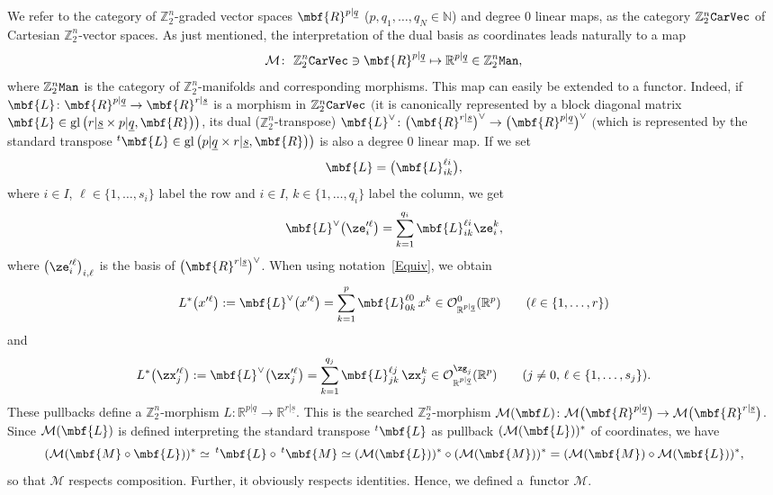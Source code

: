 \documentclass[pdftex]{sigma}%
\newcommand{\op}[1]{\operatorname{#1}}
\newcommand{\R}{{\mathbb R}}
\newcommand{\Z}{{\mathbb Z}}
\def\ul{\underline}
\def\cM{\cal M}
\def\cO{\mathcal{O}}
\def\cM{\mathcal{M}}
\def\ul{\underline}
\newcommand{\0}{\otimes}
\numberwithin{equation}{section}
\begin{document}
We refer to the category of $\Z_2^n$-graded vector spaces $\mbf{R}^{p|\ul q}$ ($p, q_1,\dots,q_N\in\mathbb N$) and degree 0 linear maps, as the category $\Z_2^n\tt CarVec$ of Cartesian $\Z_2^n$-vector spaces. As just mentioned, the interpretation of the dual basis as coordinates leads naturally to a map
\[
\mathcal{M}\colon\ \Z_2^n{\tt CarVec}\ni\mbf{R}^{p|\ul q}\mapsto \R^{p|\ul q}\in\Z_2^n\tt Man,
\]
where $\Z_2^n\tt Man$ is the category of $\Z_2^n$-manifolds and corresponding morphisms. This map can easily be extended to a functor. Indeed, if $\mbf{L}\colon \mbf{R}^{p|\ul q}\to \mbf{R}^{r|\ul s}$ is a morphism in $\Z_2^n\tt CarVec$ $\big($it is canonically represented by a block diagonal matrix $\mbf{L}\in\op{gl}\big(r|\ul{s}\times p|\ul{q},\mbf{R}\big)\big)$, its dual ($\Z_2^n$-transpose) $\mbf{L}^\vee\colon \big(\mbf{R}^{r|\ul s}\big)^\vee\to \big(\mbf{R}^{p|\ul q}\big)^\vee$ $\big($which is represented by the standard transpose $^t\mbf{L}\in\op{gl}\big(p|\ul{q}\times r|\ul{s},\mbf{R}\big)\big)$ is also a degree 0 linear map. If we set
\[
\mbf{L}=\big(\mbf{L}^{\ell i}_{i k}\big),
\]
where $i\in I$, $\ell\in\{1,\dots, s_i\}$ label the row and $i\in I$, $k\in\{1,\dots,q_i\}$ label the column, we get
\[
\mbf{L}^\vee\big(\ze'^\ell_i\big)=\sum_{k=1}^{q_i} \mbf{L}^{\ell i}_{i k}\ze^k_i,
\]
where $\big(\ze'^\ell_i\big)_{i,\ell}$ is the basis of $\big(\mbf{R}^{r|\ul s}\big)^\vee$. When using notation~\eqref{Equiv}, we obtain
\begin{gather}\label{Pull1}
L^*\big(x'^\ell\big):=\mbf{L}^\vee\big(x'^\ell\big)=\sum_{k=1}^{p} \mbf{L}^{\ell 0}_{0 k}\,x^k\in \cO_{\R^{p|\ul q}}^{0}(\R^p)\qquad(\ell\in\{1,\dots, r\})
\end{gather}
and
\begin{gather}\label{Pull2}
L^*\big(\zx'^{\ell}_j\big):=\mbf{L}^\vee\big(\zx'^\ell_j\big)=\sum_{k=1}^{q_j} \mbf{L}^{\ell j}_{j k}\,\zx^k_j\in\cO_{\R^{p|\ul q}}^{\zg_j}(\R^p)\qquad(j\neq 0,\,\ell\in\{1,\dots,s_j\}).
\end{gather}
These pullbacks define a $\Z_2^n$-morphism $L\colon \R^{p|\ul q}\to \R^{r|\ul s}$. This is the searched $\Z_2^n$-morphism $\cM(\mbf L)\colon \cM\big(\mbf{R}^{p|\ul q}\big)\to \cM\big(\mbf{R}^{r|\ul s}\big)$. Since $\cM(\mbf{L})$ is defined interpreting the standard transpose $^t\mbf{L}$ as pullback $(\cM(\mbf{L}))^*$ of coordinates, we have \[
(\cM(\mbf{M}\circ\mbf{L}))^*\simeq\, ^t\mbf{L}\circ\,^t\mbf{M}\simeq(\cM(\mbf{L}))^*\circ(\cM(\mbf{M}))^*=(\cM(\mbf{M})\circ\cM(\mbf{L}))^*,
\]
so that $\cM$ respects composition. Further, it obviously respects identities. Hence, we defined a~functor $\cM$.
\end{document}
